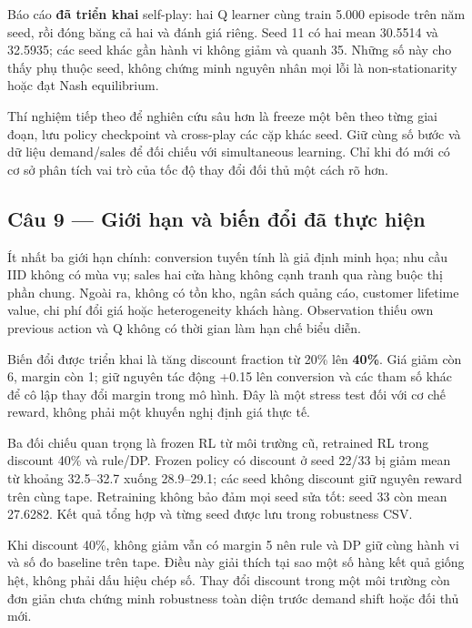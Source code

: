 Báo cáo \textbf{đã triển khai} self-play: hai Q learner cùng train 5.000
episode trên năm seed, rồi đóng băng cả hai và đánh giá riêng. Seed 11
có hai mean 30.5514 và 32.5935; các seed khác gần hành vi không giảm và
quanh 35. Những số này cho thấy phụ thuộc seed, không chứng minh nguyên
nhân mọi lỗi là non-stationarity hoặc đạt Nash equilibrium.

Thí nghiệm tiếp theo để nghiên cứu sâu hơn là freeze một bên theo từng
giai đoạn, lưu policy checkpoint và cross-play các cặp khác seed. Giữ
cùng số bước và dữ liệu demand/sales để đối chiếu với simultaneous
learning. Chỉ khi đó mới có cơ sở phân tích vai trò của tốc độ thay đổi
đối thủ một cách rõ hơn.

\subsection{Câu 9 --- Giới hạn và biến đổi đã thực
hiện}\label{cuxe2u-9-giux1edbi-hux1ea1n-vuxe0-biux1ebfn-ux111ux1ed5i-ux111uxe3-thux1ef1c-hiux1ec7n}

Ít nhất ba giới hạn chính: conversion tuyến tính là giả định minh họa;
nhu cầu IID không có mùa vụ; sales hai cửa hàng không cạnh tranh qua
ràng buộc thị phần chung. Ngoài ra, không có tồn kho, ngân sách quảng
cáo, customer lifetime value, chi phí đổi giá hoặc heterogeneity khách
hàng. Observation thiếu own previous action và Q không có thời gian làm
hạn chế biểu diễn.

Biến đổi được triển khai là tăng discount fraction từ 20\% lên
\textbf{40\%}. Giá giảm còn 6, margin còn 1; giữ nguyên tác động +0.15
lên conversion và các tham số khác để cô lập thay đổi margin trong mô
hình. Đây là một stress test đối với cơ chế reward, không phải một
khuyến nghị định giá thực tế.

Ba đối chiếu quan trọng là frozen RL từ môi trường cũ, retrained RL
trong discount 40\% và rule/DP. Frozen policy có discount ở seed 22/33
bị giảm mean từ khoảng 32.5--32.7 xuống 28.9--29.1; các seed không
discount giữ nguyên reward trên cùng tape. Retraining không bảo đảm mọi
seed sửa tốt: seed 33 còn mean 27.6282. Kết quả tổng hợp và từng seed
được lưu trong robustness CSV.

Khi discount 40\%, không giảm vẫn có margin 5 nên rule và DP giữ cùng
hành vi và số đo baseline trên tape. Điều này giải thích tại sao một số
hàng kết quả giống hệt, không phải dấu hiệu chép số. Thay đổi discount
trong một môi trường còn đơn giản chưa chứng minh robustness toàn diện
trước demand shift hoặc đối thủ mới.


